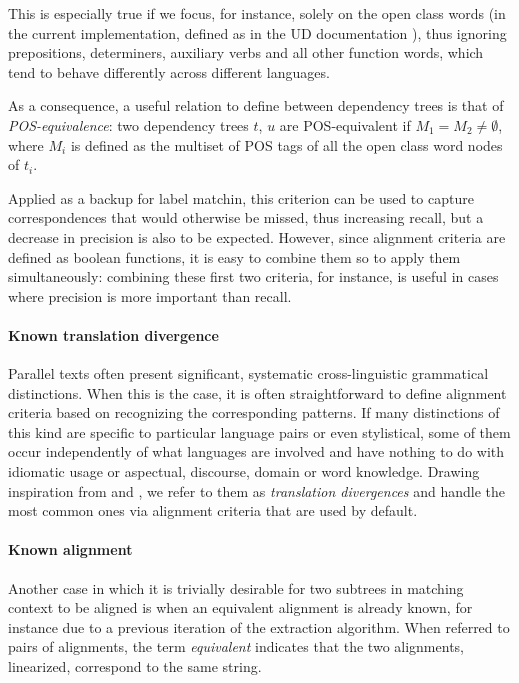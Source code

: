 \documentclass[11pt]{article}
\begin{document}
This is especially true if we focus, for instance, solely on the open class words (in the current implementation, defined as in the UD documentation \cite{TODO:}), thus ignoring prepositions, determiners, auxiliary verbs and all other function words, which tend to behave differently across different languages.

As a consequence, a useful relation to define between dependency trees is that of \textit{POS-equivalence}: two dependency trees $t$, $u$ are POS-equivalent if $M_1 = M_2 \neq \emptyset$, where $M_i$ is defined as the multiset of POS tags of all the open class word nodes of $t_i$. 

Applied as a backup for label matchin, this criterion can be used to capture correspondences that would otherwise be missed, thus increasing recall, but a decrease in precision is also to be expected. 
However, since alignment criteria are defined as boolean functions, it is easy to combine them so to apply them simultaneously: combining these first two criteria, for instance, is useful in cases where precision is more important than recall.

\paragraph{Known translation divergence}
Parallel texts often present significant, systematic cross-linguistic grammatical distinctions. 
When this is the case, it is often straightforward to define alignment criteria based on recognizing the corresponding patterns.
If many distinctions of this kind are specific to particular language pairs or even stylistical, some of them occur independently of what languages are involved and have nothing to do with idiomatic usage or aspectual, discourse, domain or word knowledge. Drawing inspiration from \cite{TODO:} and \cite{TODO:}, we refer to them as \textit{translation divergences} and handle the most common ones via alignment criteria that are used by default. 


\paragraph{Known alignment} \label{ka}
Another case in which it is trivially desirable for two subtrees in matching context to be aligned is when an equivalent alignment is already known, for instance due to a previous iteration of the extraction algorithm. 
When referred to pairs of alignments, the term \textit{equivalent} indicates that the two alignments, linearized, correspond to the same string.
\end{document}
